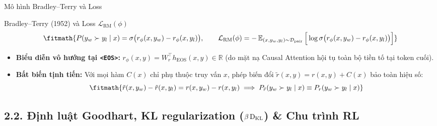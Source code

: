 \begin{frame}{Mô hình Bradley--Terry và Loss}
  \begin{block}{Bradley--Terry (1952) và Loss $\mathcal{L}_{\text{RM}}(\phi)$}
    \small
    \[
      \fitmath{%
      P(y_w \succ y_l \mid x) = \sigma\big(r_\phi(x, y_w) - r_\phi(x, y_l)\big), \qquad
      \mathcal{L}_{\text{RM}}(\phi) = -\E_{(x, y_w, y_l) \sim \mathcal{D}_{\text{pair}}} \Big[ \log \sigma\big(r_\phi(x, y_w) - r_\phi(x, y_l)\big) \Big]
      }
    \]
  \end{block}

  \small
  \begin{itemize}\setlength{\itemsep}{4pt}
    \item \textbf{Biểu diễn vô hướng tại \texttt{<EOS>}:} $r_\phi(x, y) = W_r^\top h_{\text{EOS}}(x, y) \in \mathbb{R}$ (do mặt nạ Causal Attention hội tụ toàn bộ tiền tố tại token cuối).
    \item \textbf{Bất biến tịnh tiến:} Với mọi hàm $C(x)$ chỉ phụ thuộc truy vấn $x$, phép biến đổi $\tilde{r}(x, y) = r(x, y) + C(x)$ bảo toàn hiệu số:
      \[
        \fitmath{%
        \tilde{r}(x, y_w) - \tilde{r}(x, y_l) = r(x, y_w) - r(x, y_l) \implies P_{\tilde{r}}(y_w \succ y_l \mid x) \equiv P_r(y_w \succ y_l \mid x)
        }
      \]
  \end{itemize}
  \par\vspace{0pt}
\end{frame}

\subsection{2.2. Định luật Goodhart, KL regularization (\texorpdfstring{$\beta \operatorname{D_{\mathrm{KL}}}$}{β D\textunderscore KL}) \& Chu trình RL}


